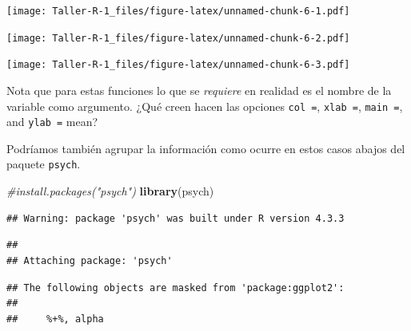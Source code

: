 \documentclass[
]{article}
\newenvironment{Shaded}{\begin{snugshade}}{\end{snugshade}}
\newcommand{\AttributeTok}[1]{\textcolor[rgb]{0.13,0.29,0.53}{#1}}
\newcommand{\CommentTok}[1]{\textcolor[rgb]{0.56,0.35,0.01}{\textit{#1}}}
\newcommand{\FunctionTok}[1]{\textcolor[rgb]{0.13,0.29,0.53}{\textbf{#1}}}
\newcommand{\NormalTok}[1]{#1}
\newcommand{\SpecialCharTok}[1]{\textcolor[rgb]{0.81,0.36,0.00}{\textbf{#1}}}
\newcommand{\StringTok}[1]{\textcolor[rgb]{0.31,0.60,0.02}{#1}}
\begin{document}
\texttt{[image: Taller-R-1\_files/figure-latex/unnamed-chunk-6-1.pdf]}

\begin{Shaded}
\end{Shaded}

\texttt{[image: Taller-R-1\_files/figure-latex/unnamed-chunk-6-2.pdf]}

\begin{Shaded}
\end{Shaded}

\texttt{[image: Taller-R-1\_files/figure-latex/unnamed-chunk-6-3.pdf]}

Nota que para estas funciones lo que se \emph{requiere} en realidad es
el nombre de la variable como argumento. ¿Qué creen hacen las opciones
\texttt{col\ =}, \texttt{xlab\ =}, \texttt{main\ =}, and
\texttt{ylab\ =} mean?

Podríamos también agrupar la información como ocurre en estos casos
abajos del paquete \texttt{psych}.

\begin{Shaded}
\begin{Highlighting}[]
\CommentTok{\#install.packages("psych")}
\FunctionTok{library}\NormalTok{(psych)}
\end{Highlighting}
\end{Shaded}

\begin{verbatim}
## Warning: package 'psych' was built under R version 4.3.3
\end{verbatim}

\begin{verbatim}
## 
## Attaching package: 'psych'
\end{verbatim}

\begin{verbatim}
## The following objects are masked from 'package:ggplot2':
## 
##     %+%, alpha
\end{verbatim}
\end{document}
